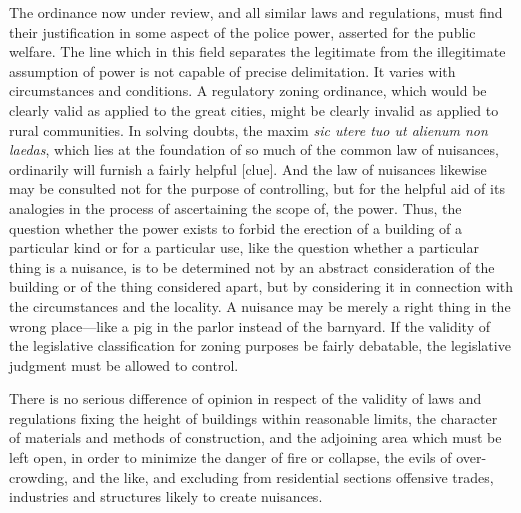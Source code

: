 The ordinance now under review, and all similar laws and regulations, must find
their justification in some aspect of the police power, asserted for the public
welfare. The line which in this field separates the legitimate from the
illegitimate assumption of power is not capable of precise delimitation. It
varies with circumstances and conditions. A regulatory zoning ordinance, which
would be clearly valid as applied to the great cities, might be clearly invalid
as applied to rural communities. In solving doubts, the maxim \textit{sic utere
tuo ut alienum non laedas}, which lies at the foundation of so much of the
common law of nuisances, ordinarily will furnish a fairly helpful [clue]. And
the law of nuisances likewise may be consulted not for the purpose of
controlling, but for the helpful aid of its analogies in the process of
ascertaining the scope of, the power. Thus, the question whether the power
exists to forbid the erection of a building of a particular kind or for a
particular use, like the question whether a particular thing is a nuisance, is
to be determined not by an abstract consideration of the building or of the
thing considered apart, but by considering it in connection with the
circumstances and the locality. A nuisance may be merely a right thing in the
wrong place---like a pig in the parlor instead of the barnyard. If the validity
of the legislative classification for zoning purposes be fairly debatable, the
legislative judgment must be allowed to control.

There is no serious difference of opinion in respect of the validity of laws and
regulations fixing the height of buildings within reasonable limits, the
character of materials and methods of construction, and the adjoining area which
must be left open, in order to minimize the danger of fire or collapse, the
evils of over-crowding, and the like, and excluding from residential sections
offensive trades, industries and structures likely to create nuisances. 

